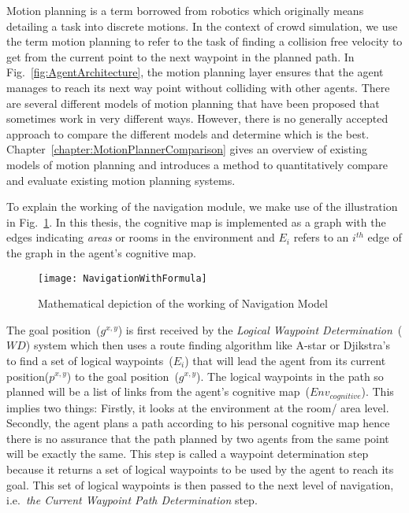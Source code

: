 Motion planning is a term borrowed from robotics which originally means detailing a task into discrete motions. In the context of crowd simulation, we use the term motion planning to refer to the task of finding a collision free velocity to get from the current point to the next waypoint in the planned path. In Fig.~\ref{fig:AgentArchitecture}, the motion planning layer ensures that the agent manages to reach its next way point without colliding with other agents. There are several different models of motion planning that have been proposed that sometimes work in very different ways. However, there is no generally accepted approach to compare the different models and determine which is the best. Chapter~\ref{chapter:MotionPlannerComparison} gives an overview of existing models of motion planning and introduces a method to quantitatively compare and evaluate existing motion planning systems.

To explain the working of the navigation module, we make use of the illustration in Fig.~\ref{fig:detailedNavigationModule}.  In this thesis, the cognitive map is implemented as a graph with the edges indicating \emph{areas} or rooms in the environment and $E_i$ refers to an $i^{th}$ edge of the graph in the agent's cognitive map.

\begin{figure}[!tb]
\centering
\texttt{[image: NavigationWithFormula]}
\caption[Detailed Navigation Model]{Mathematical depiction of the working of Navigation Model}
\label{fig:detailedNavigationModule}
\end{figure}

The goal position~($g^{x,y}$) is first received by the \emph{Logical Waypoint Determination}~($WD$) system which then uses a route finding algorithm like A-star or Djikstra's~\cite{Russel:1995wca} to find a set of logical waypoints~($E_i$) that will lead the agent from its current position($p^{x,y}$) to the goal position~($g^{x,y}$). The logical waypoints in the path so planned will be a list of links from the agent's cognitive map~($Env_{cognitive}$). This implies two things: Firstly, it looks at the environment at the room/ area level. Secondly, the agent plans a path according to his personal cognitive map hence there is no assurance that the path planned by two agents from the same point will be exactly the same. This step is called a waypoint determination step because it returns a set of logical waypoints to be used by the agent to reach its goal. This set of logical waypoints is then passed to the next level of navigation, i.e.\ \emph{the Current Waypoint Path Determination} step.

